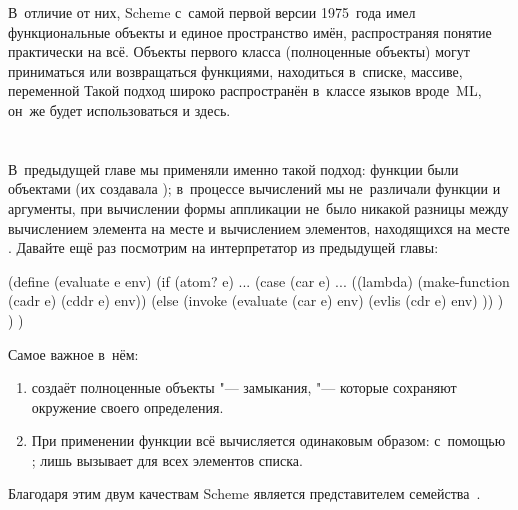 В~отличие от них, Scheme с~самой первой версии 1975~года имел функциональные
объекты и единое пространство имён, распространяя понятие 
практически на всё. Объекты первого класса (полноценные объекты) могут
приниматься или возвращаться функциями, находиться в~списке, массиве, переменной
{\itd} Такой подход широко распространён в~классе языков вроде~ML, он~же будет
использоваться и здесь.


\section{\texorpdfstring{\protect{}}{Lisp₁}}\label{lisp1-2-omega/sect:lisp1}

В~предыдущей главе мы применяли именно такой подход: функции были объектами
(их создавала ); в~процессе вычислений мы не~различали
функции и аргументы, при вычислении формы аппликации не~было никакой разницы
между вычислением элемента на месте  и вычислением элементов,
находящихся на месте . Давайте ещё раз посмотрим на
интерпретатор из предыдущей главы:

\begin{code:lisp}
(define (evaluate e env)
  (if (atom? e) ...
      (case (car e)
        ...
        ((lambda) (make-function (cadr e) (cddr e) env))
        (else (invoke (evaluate (car e) env)
                      (evlis (cdr e) env) )) ) ) )
\end{code:lisp}

Самое важное в~нём:

\begin{enumerate}
  \item {} создаёт полноценные объекты "--- замыкания, "---
        которые сохраняют окружение своего определения.

  \item При применении функции всё вычисляется одинаковым образом:
        с~помощью ;  лишь вызывает
         для всех элементов списка.
\end{enumerate}

Благодаря этим двум качествам Scheme является представителем семейства~.


\section{\texorpdfstring{\protect{}}{Lisp₂}}\label{lisp1-2-omega/sect:lisp2}

